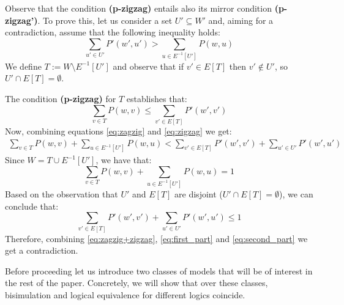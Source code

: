 \begin{remark}
    Observe that the condition \textbf{(p-zigzag)} entails also its mirror condition \textbf{(p-zigzag')}. To prove this, let us consider a set $U'\subseteq W'$ and, aiming for a contradiction, assume that the following inequality holds:
    \begin{equation} \label{eq:zagzig}
        \displaystyle \sum_{u' \in U'} P'(w', u') > \displaystyle \sum_{ u  \in  E^{-1}[U']} P(w, u)
    \end{equation}
    We define $T := W \setminus E^{-1}[U']$ and observe that if $v'\in E[T]$ then $v'\notin U'$, so $U'\cap E[T]=\emptyset$. 

    The condition \textbf{(p-zigzag)} for $T$ establishes that:
    \begin{equation} \label{eq:zigzag}
        \displaystyle \sum_{v \in T} P(w, v) \leq \displaystyle \sum_{ v' \in E[T]} P'(w', v')
    \end{equation}
    Now, combining equations \eqref{eq:zagzig} and \eqref{eq:zigzag} we get:
    \begin{multline}
        \label{eq:zagzig+zigzag}
        \displaystyle \sum_{v \in T} P(w, v) 
        +
        \displaystyle \sum_{ u \in E^{-1}[U']} P(w, u) <  
        \displaystyle \sum_{ v' \in E[T]} P'(w', v')
        +
        \displaystyle \sum_{u' \in U'} P'(w', u')
    \end{multline}
    Since $W = T \cup E^{-1} [U'] $, we have that:
    \begin{equation}
        \label{eq:first_part}
        \displaystyle \sum_{v \in T} P(w, v) 
        +
        \displaystyle \sum_{ u \in E^{-1}[U']} P(w, u)
        =
        1
    \end{equation}
    Based on the observation that $U'$ and $E[T]$ are disjoint ($U'\cap E[T]=\emptyset$), we can conclude that:
    \begin{equation}
        \label{eq:second_part}
        \displaystyle \sum_{ v' \in  E[T]} P'(w', v')
        +
        \displaystyle \sum_{u' \in U'} P'(w', u')
        \leq
        1
    \end{equation}
    Therefore, combining \eqref{eq:zagzig+zigzag}, \eqref{eq:first_part} and \eqref{eq:second_part} we get a contradiction.
\end{remark}

Before proceeding let us introduce two classes of models that will be of interest in the rest of the paper. Concretely, we will show that over these classes, bisimulation and logical equivalence for different logics coincide.

